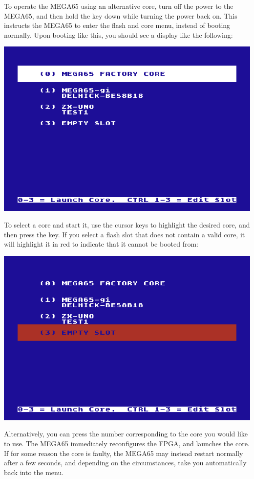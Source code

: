 To operate the MEGA65 using an alternative core, turn off the power to the MEGA65, and then hold the
 key down while turning the power back on.  This instructs the MEGA65 to enter the
flash and core menu, instead of booting normally. Upon booting like this, you should see a display like the following:

\includegraphics[width=\linewidth]{images/ss-flashmenu.png}

To select a core and start it, use the cursor keys to highlight the desired core, and then press the
 key.  If you select a flash slot that does not
contain a valid core, it will highlight it in red to indicate that it
cannot be booted from:

\includegraphics[width=\linewidth]{images/ss-flashmenu-invalidslot.png}

Alternatively, you can press the number corresponding to the core you would
like to use. The MEGA65 immediately reconfigures the FPGA, and launches the core.  If for some reason
the core is faulty, the MEGA65 may instead restart normally after a few seconds, and depending on the
circumstances, take you automatically back into the menu.

